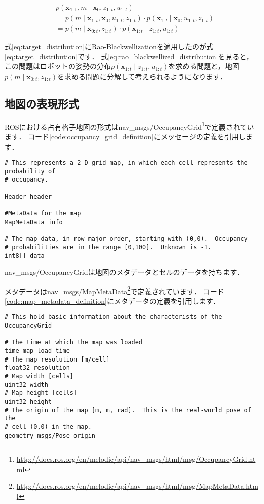 \documentclass[{../../master}]{subfiles}
\begin{document}
\begin{equation}
  \begin{split}
    &p(\bm{x_{1:t}}, m \mid \bm{x}_{0}, z_{1:t}, u_{1:t}) \\
    &= p(m \mid \bm{x}_{1:t}, \bm{x}_{0}, u_{1:t}, z_{1:t}) \cdot p(\bm{x}_{1:t} \mid \bm{x}_{0}, u_{1:t}, z_{1:t}) \\
    &= p(m \mid \bm{x}_{0:t}, z_{1:t}) \cdot p(\bm{x}_{1:t} \mid z_{1:t}, u_{1:t})
  \end{split}
  \label{eq:rao_blackwellized_distribution}
\end{equation}

式\ref{eq:target_distribution}にRao-Blackwellizationを適用したのが式\ref{eq:target_distribution}です．
式\ref{eq:rao_blackwellized_distribution}を見ると，この問題はロボットの姿勢の分布$p(\bm{x}_{1:t} \mid z_{1:t}, u_{1:t})$を求める問題と，地図$p(m \mid \bm{x}_{0:t}, z_{1:t})$を求める問題に分解して考えられるようになります．

\subsection{地図の表現形式}

ROSにおける占有格子地図の形式は\textsf{nav\_msgs/OccupancyGrid}\footnote{\url{http://docs.ros.org/en/melodic/api/nav_msgs/html/msg/OccupancyGrid.html}}で定義されています．
コード\ref{code:occupancy_grid_definition}にメッセージの定義を引用します．

\begin{lstlisting}[label=code:occupancy_grid_definition, caption=Message Difinition of \textsf{nav\_msgs/OccupancyGrid}]
# This represents a 2-D grid map, in which each cell represents the probability of
# occupancy.

Header header 

#MetaData for the map
MapMetaData info

# The map data, in row-major order, starting with (0,0).  Occupancy
# probabilities are in the range [0,100].  Unknown is -1.
int8[] data
\end{lstlisting}

\textsf{nav\_msgs/OccupancyGrid}は地図のメタデータとセルのデータを持ちます．

メタデータは\textsf{nav\_msgs/MapMetaData}\footnote{\url{http://docs.ros.org/en/melodic/api/nav_msgs/html/msg/MapMetaData.html}}で定義されています．
コード\ref{code:map_metadata_definition}にメタデータの定義を引用します．

\begin{lstlisting}[label=code:map_metadata_definition, caption=Message Definition of \textsf{nav\_msgs/MapMetaData}]
# This hold basic information about the characterists of the OccupancyGrid

# The time at which the map was loaded
time map_load_time
# The map resolution [m/cell]
float32 resolution
# Map width [cells]
uint32 width
# Map height [cells]
uint32 height
# The origin of the map [m, m, rad].  This is the real-world pose of the
# cell (0,0) in the map.
geometry_msgs/Pose origin
\end{lstlisting}
\end{document}

